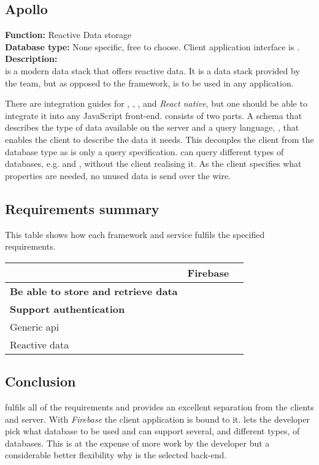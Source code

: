 \subsection*{Apollo}
\textbf{Function:} Reactive Data storage
\\
\textbf{Database type:} None specific, free to choose.
Client application interface is .
\\
\textbf{Description:}
\\
 is a modern data stack that offers reactive data.
It is a data stack provided by the  team, but as opposed to the  framework,  is to be used in any application.

There are integration guides for , , ,  and \textit{React native}, but one should be able to integrate it into any JavaScript front-end.
 consists of two parts.
A schema that describes the type of data available on the server and a query language, , that enables the client to describe the data it needs.
This decouples the client from the database type as  is only a query specification.
 can query different types of databases, e.g.  and , without the client realising it.
As the client specifies what properties are needed, no unused data is send over the wire.

\subsection*{Requirements summary}
This table shows how each framework and service fulfils the specified requirements.

\begin{tabularx}{\textwidth}{|l|C C|}
	\hline
	 & Firebase &  \\
	\hline
	\textbf{Be able to store and retrieve data} & \cmark & \cmark \\
	\hline
	\textbf{Support authentication} & \cmark & \cmark \\
	\hline
	Generic \gls{api} & \xmark & \cmark \\
	\hline
	Reactive data & \cmark & \cmark \\
	\hline
\end{tabularx}

\subsection*{Conclusion}
 fulfils all of the requirements and provides an excellent separation from the clients and server.
With \textit{Firebase} the client application is bound to it.
 lets the developer pick what database to be used and can support several, and different types, of databases.
This is at the expense of more work by the developer but a considerable better flexibility why  is the selected back-end.
